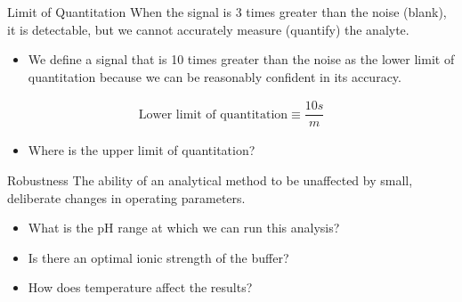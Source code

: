 \documentclass[notes=hide]{beamer}
\begin{document}
\begin{frame}{Limit of Quantitation}
		When the signal is 3 times greater than the noise (blank),
			it is detectable, but we cannot accurately measure
			(quantify) the analyte.
	\begin{itemize}
		\item We define a signal that is 10 times greater than the noise
			as the \alert{lower limit of quantitation} because we
			can be \alert{reasonably} confident in its accuracy.
	\end{itemize}

	\begin{align*}
		\text{Lower limit of quantitation} \equiv \dfrac{10s}{m}
	\end{align*}

	\begin{itemize}
		\item Where is the upper limit of quantitation?
	\end{itemize}
\end{frame}

\begin{frame}{Robustness}
	The ability of an analytical method to be unaffected by small,
	deliberate changes in operating parameters.

	\begin{itemize}
		\item What is the pH range at which we can run this analysis?
		\item Is there an optimal ionic strength of the buffer?
		\item How does temperature affect the results?
	\end{itemize}
\end{frame}



\end{document}
